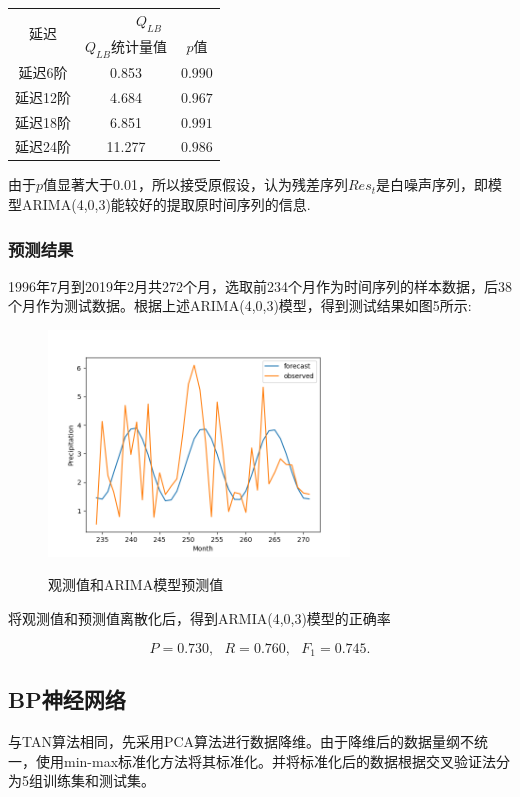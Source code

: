 \documentclass{ctexart}
\begin{document}
\begin{table}[!htb]\center
\begin{tabular}{|c|c|c|}
\hline
\multirow{2}{*}{延迟}&\multicolumn{2}{|c|}{$Q_{LB}$}\\
\cline{2-3}
&$Q_{LB}$统计量值&$p$值\\
\hline
延迟6阶              &          0.853 &                  $ 0.990$\\
\hline

延迟12阶              &              4.684         &      $ 0.967$\\
\hline
延迟18阶              &              6.851         &      $ 0.991$\\
\hline
延迟24阶              &              11.277         &      $ 0.986$\\
\hline
\end{tabular}
\end{table}

由于$p$值显著大于0.01，所以接受原假设，认为残差序列$Res_{t}$是白噪声序列，即模型ARIMA(4,0,3)能较好的提取原时间序列的信息.


\subsubsection{预测结果}
1996年7月到2019年2月共272个月，选取前234个月作为时间序列的样本数据，后38个月作为测试数据。根据上述ARIMA(4,0,3)模型，得到测试结果如图5所示:
\begin{figure}[!h]
  \centering
  \includegraphics[width=8cm]{arima.png}\\
  \caption{{\fangsong 观测值和ARIMA模型预测值}}
\end{figure}

将观测值和预测值离散化后，得到ARMIA(4,0,3)模型的正确率

$$P= 0.730,\ \ \ R= 0.760 ,\ \ \ F_{1}= 0.745.$$

\subsection{BP神经网络}
        与TAN算法相同，先采用PCA算法进行数据降维。由于降维后的数据量纲不统一，使用min-max标准化方法将其标准化。并将标准化后的数据根据交叉验证法分为5组训练集和测试集。
\end{document}
